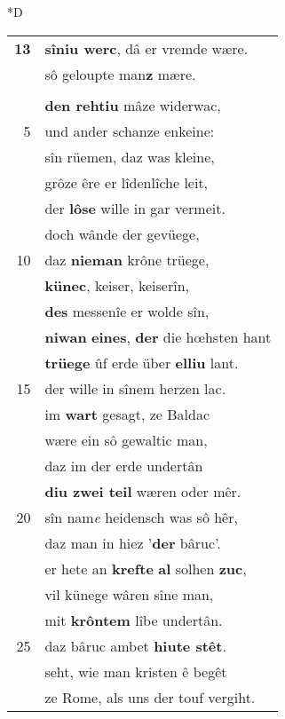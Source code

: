 \documentclass[8pt,a4paper,notitlepage]{article}
\begin{document}
\begin{table}[ht]
\begin{minipage}[t]{0.5\linewidth}
\small
\begin{center}*D
\end{center}
\begin{tabular}{rl}
\textbf{13} & \textbf{sîniu werc}, dâ er vremde wære.\\ 
 & sô geloupte man\textbf{z} mære.\\ 
 & \textit{\begin{large}G\end{large}}ahmuret der site pflac,\\ 
 & \textbf{den rehtiu} mâze widerwac,\\ 
5 & und ander schanze enkeine:\\ 
 & sîn rüemen, daz was kleine,\\ 
 & grôze êre er lîdenlîche leit,\\ 
 & der \textbf{lôse} wille in gar vermeit.\\ 
 & doch wânde der gevüege,\\ 
10 & daz \textbf{nieman} krône trüege,\\ 
 & \textbf{künec}, keiser, keiserîn,\\ 
 & \textbf{des} messenîe er wolde sîn,\\ 
 & \textbf{niwan} \textbf{eines}, \textbf{der} die hœhsten hant\\ 
 & \textbf{trüege} ûf erde über \textbf{elliu} lant.\\ 
15 & der wille in sînem herzen lac.\\ 
 & im \textbf{wart} gesagt, ze Baldac\\ 
 & wære ein sô gewaltic man,\\ 
 & daz im der erde undertân\\ 
 & \textbf{diu zwei teil} wæren oder mêr.\\ 
20 & sîn nam\textit{e} heidensch was sô hêr,\\ 
 & daz man in hiez '\textbf{der} bâruc'.\\ 
 & er hete an \textbf{krefte} \textbf{al} solhen \textbf{zuc},\\ 
 & vil künege wâren sîne man,\\ 
 & mit \textbf{krôntem} lîbe undertân.\\ 
25 & daz bâruc ambet \textbf{hiute stêt}.\\ 
 & seht, wie man kristen ê begêt\\ 
 & ze Rome, als uns der touf vergiht.\\ 

\end{tabular}
\end{minipage}
\end{table}
\end{document}
